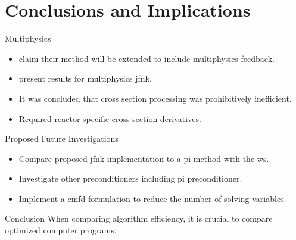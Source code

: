 \section{Conclusions and Implications}
\label{sec:conclusion}

\begin{frame}{Multiphysics }
  \begin{itemize}
    \item \citeauthor{qe2paper} claim their method will be extended to include
      multiphysics feedback.
    \item \citeauthor{caslJFNK} present results for multiphysics \gls{jfnk}.
    \item It was concluded that cross section processing was prohibitively
      inefficient.
    \item Required reactor-specific cross section derivatives.
  \end{itemize}
\end{frame}

\begin{frame}{Proposed Future Investigations}
  \begin{itemize}
    \item Compare proposed \gls{jfnk} implementation to a \gls{pi} method with
      the \gls{ws}.
    \item Investigate other preconditioners including \gls{pi} preconditioner.
    \item Implement a \gls{cmfd} formulation to reduce the number of solving
      variables.
  \end{itemize}
\end{frame}

\begin{frame}{Conclusion}
  \centering
  \Large
  When comparing algorithm efficiency, it is crucial to compare optimized
  computer programs.
\end{frame}
